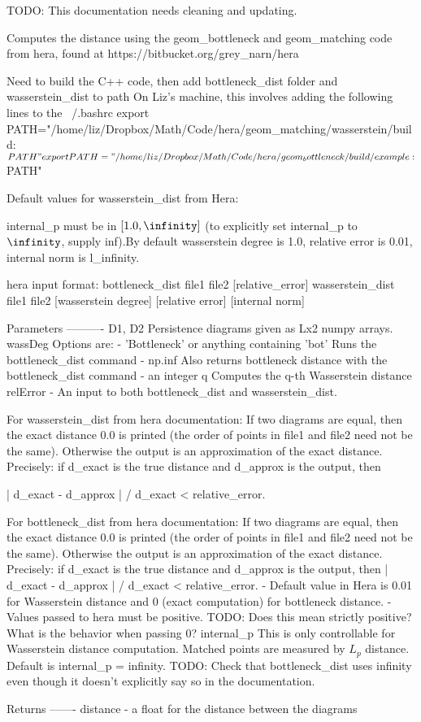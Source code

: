\begin{DoxyVerb}TODO: This documentation needs cleaning and updating.

Computes the distance using the geom_bottleneck and geom_matching code
from hera, found at https://bitbucket.org/grey_narn/hera

Need to build the C++ code, then add bottleneck_dist folder and wasserstein_dist to path
On Liz's machine, this involves adding the following lines to the ~/.bashrc
    export PATH="/home/liz/Dropbox/Math/Code/hera/geom_matching/wasserstein/build:$PATH"
    export PATH="/home/liz/Dropbox/Math/Code/hera/geom_bottleneck/build/example:$PATH"


Default values for wasserstein_dist from Hera: 



internal_p must be in $[1.0, \infinity]$ (to explicitly set internal_p to $\infinity$, supply inf).By default wasserstein degree is 1.0, relative error is 0.01, internal norm is l_infinity.

hera input format:
bottleneck_dist file1 file2  [relative_error]
wasserstein_dist file1 file2  [wasserstein degree] [relative error] [internal norm] 



Parameters
----------
D1, D2
    Persistence diagrams given as Lx2 numpy arrays.
wassDeg
    Options are:
    - 'Bottleneck' or anything containing 'bot'
        Runs the bottleneck_dist command
    - np.inf 
        Also returns bottleneck distance with the bottleneck_dist command
    - an integer q 
        Computes the q-th Wasserstein distance
relError
    - An input to both bottleneck_dist and wasserstein_dist.

      For wasserstein_dist from hera documentation:
        If two diagrams are equal, then the exact distance 0.0 is printed (the order of points in file1 and file2 need not be the same).
        Otherwise the output is an approximation of the exact distance. Precisely:
        if d_exact is the true distance and d_approx is the output, then 

            | d_exact - d_approx | / d_exact < relative_error.

      For bottleneck_dist from hera documentation:
        If two diagrams are equal, then the exact distance 0.0 is printed (the order of points in file1 and file2 need not be the same). Otherwise the output is an approximation of the exact distance. Precisely: if d_exact is the true distance and d_approx is the output, then 
            | d_exact - d_approx | / d_exact < relative_error.
    - Default value in Hera is 0.01 for Wasserstein distance and 0 (exact computation) for bottleneck distance. 
    - Values passed to hera must be positive. TODO: Does this mean strictly positive? What is the behavior when passing 0?
internal_p
    This is only controllable for Wasserstein distance computation.  Matched points are measured by $L_p$ distance.
    Default is internal_p = infinity.
    TODO: Check that bottleneck_dist uses infinity even though it doesn't explicitly say so in the documentation.



Returns
-------
distance
    - a float for the distance between the diagrams\end{DoxyVerb}
 
